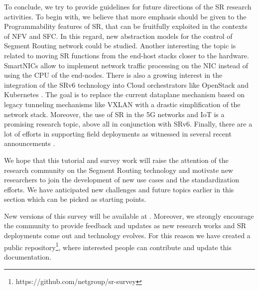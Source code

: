 To conclude, we try to provide guidelines for future directions of the SR research activities. To begin with, we believe that more emphasis should be given to the Programmability features of SR, that can be fruitfully exploited in the contexts of NFV and SFC. In this regard, new abstraction models for the control of Segment Routing network could be studied. Another interesting the topic is related to moving SR functions from the end-host stacks closer to the hardware. SmartNICs allow to implement network traffic processing on the NIC instead of using the CPU of the end-nodes. There is also a growing interest in the integration of the SRv6 technology into Cloud orchestrators like OpenStack \cite{openstack} and Kubernetes \cite{kubernetes}. The goal is to replace the current dataplane mechanism based on legacy tunneling mechanisms like VXLAN with a drastic simplification of the network stack. Moreover, the use of SR in the 5G networks and IoT is a promising research topic, above all in conjunction with SRv6. Finally, there are a lot of efforts in supporting field deployments as witnessed in several recent announcements \cite{srnews}. 

We hope that this tutorial and survey work will raise the attention of the research community on the Segment Routing technology and motivate new researchers to join the development of new use cases and the standardization efforts. We have anticipated new challenges and future topics earlier in this section which can be picked as starting points.

New versions of this survey will be available at \cite{ventre2019survey}. Moreover, we strongly encourage the community to provide feedback and updates as new research works and SR deployments come out and technology evolves. For this reason we have created a public repository\footnote{https://github.com/netgroup/sr-survey}, where interested people can contribute and update this documentation.